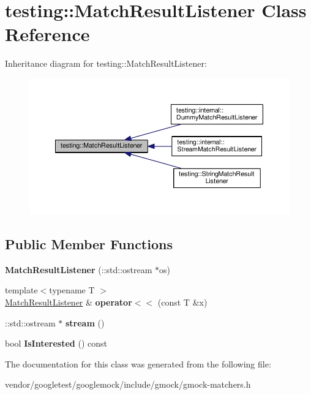 \hypertarget{classtesting_1_1_match_result_listener}{}\section{testing\+:\+:Match\+Result\+Listener Class Reference}
\label{classtesting_1_1_match_result_listener}


Inheritance diagram for testing\+:\+:Match\+Result\+Listener\+:
\nopagebreak
\begin{figure}[H]
\begin{center}
\leavevmode
\includegraphics[width=350pt]{classtesting_1_1_match_result_listener__inherit__graph}
\end{center}
\end{figure}
\subsection*{Public Member Functions}
\begin{DoxyCompactItemize}
\item 
\mbox{\label{classtesting_1_1_match_result_listener_a245c360286cd0496d22a4d2fde80eb0b}} 
{\bfseries Match\+Result\+Listener} (\+::std\+::ostream $\ast$os)
\item 
\mbox{\label{classtesting_1_1_match_result_listener_a89f628a452635d1502a9062d9c864ebd}} 
{\footnotesize template$<$typename T $>$ }\\\mbox{\hyperlink{classtesting_1_1_match_result_listener}{Match\+Result\+Listener}} \& {\bfseries operator$<$$<$} (const T \&x)
\item 
\mbox{\label{classtesting_1_1_match_result_listener_a5abecb247e005f7f50a94898e3f44ee3}} 
\+::std\+::ostream $\ast$ {\bfseries stream} ()
\item 
\mbox{\label{classtesting_1_1_match_result_listener_ac34f9771f2ba6128cd6a1348b3aebda3}} 
bool {\bfseries Is\+Interested} () const
\end{DoxyCompactItemize}


The documentation for this class was generated from the following file\+:\begin{DoxyCompactItemize}
\item 
vendor/googletest/googlemock/include/gmock/gmock-\/matchers.\+h\end{DoxyCompactItemize}
